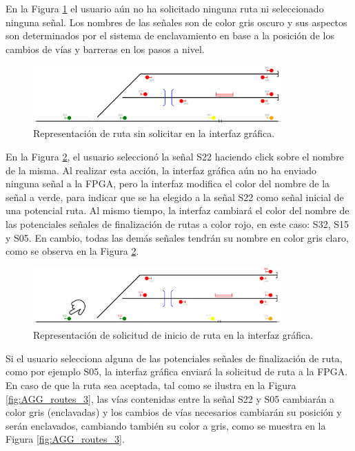 	En la Figura \ref{fig:AGG_routes_1} el usuario aún no ha solicitado ninguna ruta ni seleccionado ninguna señal. Los nombres de las señales son de color gris oscuro y sus aspectos son determinados por el sistema de enclavamiento en base a la posición de los cambios de vías y barreras en los pasos a nivel.	
	
	\begin{figure}[H]
		\centering
		\includegraphics[width=0.85\textwidth]{AGG/images/AGG_routes_1}
		\centering\caption{Representación de ruta sin solicitar en la interfaz gráfica.}
		\label{fig:AGG_routes_1}
	\end{figure}
	
	En la Figura \ref{fig:AGG_routes_2}, el usuario seleccionó la señal S22 haciendo click sobre el nombre de la misma. Al realizar esta acción, la interfaz gráfica aún no ha enviado ninguna señal a la FPGA, pero la interfaz modifica el color del nombre de la señal a verde, para indicar que se ha elegido a la señal S22 como señal inicial de una potencial ruta. Al mismo tiempo, la interfaz cambiará el color del nombre de las potenciales señales de finalización de rutas a color rojo, en este caso: S32, S15 y S05. En cambio, todas las demás señales tendrán su nombre en color gris claro, como se observa en la Figura \ref{fig:AGG_routes_2}. 
	
	\begin{figure}[H]
		\centering
		\includegraphics[width=0.85\textwidth]{AGG/images/AGG_routes_2}
		\centering\caption{Representación de solicitud de inicio de ruta en la interfaz gráfica.}
		\label{fig:AGG_routes_2}
	\end{figure}
	
	Si el usuario selecciona alguna de las potenciales señales de finalización de ruta, como por ejemplo S05, la interfaz gráfica enviará la solicitud de ruta a la FPGA. En caso de que la ruta sea aceptada, tal como se ilustra en la Figura \ref{fig:AGG_routes_3}, las vías contenidas entre la señal S22 y S05 cambiarán a color gris (enclavadas) y los cambios de vías necesarios cambiarán su posición y serán enclavados, cambiando también su color a gris, como se muestra en la Figura \ref{fig:AGG_routes_3}.
	
